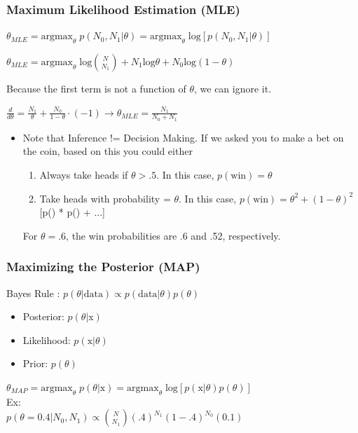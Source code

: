 \documentclass{article}
\begin{document}
\subsubsection*{Maximum Likelihood Estimation (MLE)}
$\theta_{MLE} = \textrm{argmax}_{\theta} \; p(N_0,N_1 | \theta) = \textrm{argmax}_{\theta}  \;\textrm{log}\left[p(N_0,N_1 | \theta)\right]$

$\theta_{MLE} = \textrm{argmax}_{\theta} \;\textrm{log}{N \choose N_1} + N_1 \textrm{log} \theta + N_0  \textrm{log} (1-\theta)$

Because the first term is not a function of $\theta$, we can ignore it.

$\frac{d}{d\theta} = \frac{N_1}{\theta} + \frac{N_0}{1-\theta} \cdot ( -1)  \rightarrow \theta_{MLE} = \frac{N_1}{N_0 + N_1}$

\begin{itemize}
\item Note that Inference != Decision Making. If we asked you to make a bet on the coin, based on this you could either
\begin{enumerate}
\item Always take heads if $\theta > .5$. In this case, $p(\text{win}) = \theta$
\item Take heads with probability = $\theta$. In this case, $p(\text{win}) = \theta^2 + (1-\theta)^2$ [p() * p() + ...]
\end{enumerate}
For $\theta = .6$, the win probabilities are .6 and .52, respectively. 
\end{itemize}

\subsubsection*{Maximizing the Posterior (MAP)}
Bayes Rule : $p(\theta|\text{data}) \propto p(\text{data}|\theta) p(\theta)$
\begin{itemize}
\item Posterior: $p(\theta | \text{x})$
\item Likelihood: $p(\text{x} | \theta)$
\item Prior: $p(\theta)$
\end{itemize}
$\theta_{MAP} = \textrm{argmax}_{\theta} \; p(\theta | \text{x}) = \textrm{argmax}_{\theta}  \;\textrm{log}\left[p(\text{x} | \theta) p(\theta)\right]$\\

Ex:\\
$p(\theta=0.4|N_0,N_1) \propto {N \choose N_1} (.4)^{N_1}(1-.4)^{N_0} (0.1)$
\end{document}
